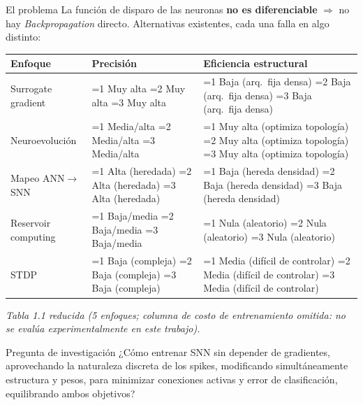 \documentclass[aspectratio=169,10pt]{beamer}
\newcommand{\semcell}[2]{%
  \ifnum#1=1 \cellcolor{semgreen!25}#2\fi
  \ifnum#1=2 \cellcolor{semyellow!30}#2\fi
  \ifnum#1=3 \cellcolor{semred!20}#2\fi
}
\begin{document}
\begin{frame}{El problema}
  \small
  La función de disparo de las neuronas \textbf{no es diferenciable} $\Rightarrow$ no hay \textit{Backpropagation} directo. Alternativas existentes, cada una falla en algo distinto:
  \vspace{-2pt}
  {\footnotesize
  \renewcommand{\arraystretch}{0.8}
  \begin{table}
  \centering
  \begin{tabular}{p{2.6cm}>{\centering\arraybackslash}p{3.6cm}>{\centering\arraybackslash}p{4.5cm}}
    \toprule
    \textbf{Enfoque} & \textbf{Precisión} & \textbf{Eficiencia estructural} \\
    \midrule
    Surrogate gradient      & \semcell{1}{Muy alta}       & \semcell{3}{Baja (arq.ja densa)} \\
    Neuroevolución          & \semcell{2}{Media/alta}     & \semcell{1}{Muy alta (optimiza topología)} \\
    Mapeo ANN$\to$SNN       & \semcell{1}{Alta (heredada)}& \semcell{3}{Baja (hereda densidad)} \\
    Reservoir computing     & \semcell{3}{Baja/media}     & \semcell{3}{Nula (aleatorio)} \\
    STDP                    & \semcell{3}{Baja (compleja)}& \semcell{2}{Media (difícil de controlar)} \\
    \bottomrule
  \end{tabular}
  \end{table}
  \textit{Tabla 1.1 reducida (5 enfoques; columna de costo de entrenamiento omitida: no se evalúa experimentalmente en este trabajo).}
  }
  \begin{alertblock}{Pregunta de investigación}
  \scriptsize ¿Cómo entrenar SNN sin depender de gradientes, aprovechando la naturaleza discreta de los spikes, modificando simultáneamente estructura y pesos, para minimizar conexiones activas y error de clasificación, equilibrando ambos objetivos?
  \end{alertblock}
\end{frame}
\end{document}
